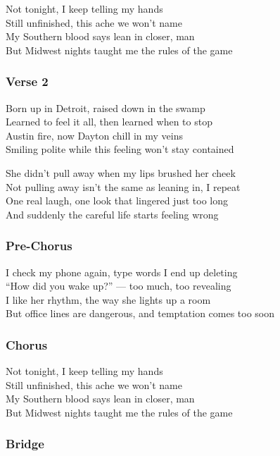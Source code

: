 Not tonight, I keep telling my hands\\
Still unfinished, this ache we won't name\\
My Southern blood says lean in closer, man\\
But Midwest nights taught me the rules of the game

\subsubsection{Verse 2}\label{verse-2-27}

Born up in Detroit, raised down in the swamp\\
Learned to feel it all, then learned when to stop\\
Austin fire, now Dayton chill in my veins\\
Smiling polite while this feeling won't stay contained

She didn't pull away when my lips brushed her cheek\\
Not pulling away isn't the same as leaning in, I repeat\\
One real laugh, one look that lingered just too long\\
And suddenly the careful life starts feeling wrong

\subsubsection{Pre-Chorus}\label{pre-chorus-69}

I check my phone again, type words I end up deleting\\
``How did you wake up?'' --- too much, too revealing\\
I like her rhythm, the way she lights up a room\\
But office lines are dangerous, and temptation comes too soon

\subsubsection{Chorus}\label{chorus-81}

Not tonight, I keep telling my hands\\
Still unfinished, this ache we won't name\\
My Southern blood says lean in closer, man\\
But Midwest nights taught me the rules of the game

\subsubsection{Bridge}\label{bridge-28}

